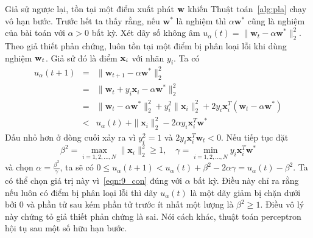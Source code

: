 Giả sử ngược lại, tồn tại một điểm xuất phát $\mathbf{w}$ khiến Thuật
toán~\ref{alg:pla} chạy vô hạn bước. Trước hết ta thấy rằng, nếu $\mathbf{w}^*$ là nghiệm thì $\alpha\mathbf{w}^*$ cũng là nghiệm của
bài toán với $\alpha > 0$ bất kỳ. Xét dãy số không âm $ u_{\alpha}(t) = \|\mathbf{w}_{t} -
\alpha\mathbf{w}^*\|_2^2$. Theo giả thiết phản chứng, luôn tồn tại một điểm bị phân
loại lỗi khi dùng nghiệm $\mathbf{w}_t$. Giả sử đó là điểm $\mathbf{x}_i$ với nhãn $y_i$. Ta
có
\begin{eqnarray}
\nonumber
u_{\alpha}(t+1) &=& \|\mathbf{w}_{t+1} - \alpha \mathbf{w}^*\|_2^2 \\\
\nonumber
&=& \|\mathbf{w}_{t} + y_i\mathbf{x}_i - \alpha\mathbf{w}^*\|_2^2 \\\
\nonumber
&=& \|\mathbf{w}_{t} -\alpha\mathbf{w}^*\|_2^2 + y_i^2\|\mathbf{x}_i\|_2^2 + 2y_i\mathbf{x}_i^T(\mathbf{w}_t - \alpha\mathbf{w}^*) \\\
\label{eqn:9_con}
&<& u_{\alpha}(t) \ + \|\mathbf{x}_i\|_2^2 - 2\alpha y_i\mathbf{x}_i^T \mathbf{w}^*
\end{eqnarray}
Dấu nhỏ hơn ở dòng cuối xảy ra vì $y_i^2 = 1$ và $2y_i\mathbf{x}_i^T\mathbf{w}_{t} <
0$. Nếu tiếp tục đặt
\begin{equation*}
\beta^2 = \max_{i=1, 2, \dots, N}\|\mathbf{x}_i\|_2^2 \geq 1, \quad
\gamma = \min_{i=1, 2, \dots, N} y_i\mathbf{x}_i^T\mathbf{w}^*
\end{equation*}
và chọn $\alpha = \frac{\beta^2}{\gamma}$, ta sẽ có
\begin{math}
0 \leq u_{\alpha}(t+1) < u_{\alpha}(t) + \beta^2 - 2\alpha\gamma = u_{\alpha}(t) - \beta^2.
\end{math} Ta có thể chọn giá trị này vì~\eqref{eqn:9_con} đúng với $\alpha$ bất kỳ. Điều này chỉ ra rằng nếu luôn có điểm bị phân loại lỗi thì dãy $u_{\alpha}(t)$ là một dãy giảm bị chặn dưới bởi 0 và phần tử sau kém phần tử trước ít nhất một lượng là $\beta^2\geq 1$. Điều vô lý này chứng tỏ giả thiết phản chứng là sai. Nói cách khác, thuật toán perceptron hội tụ sau một số hữu hạn bước.









